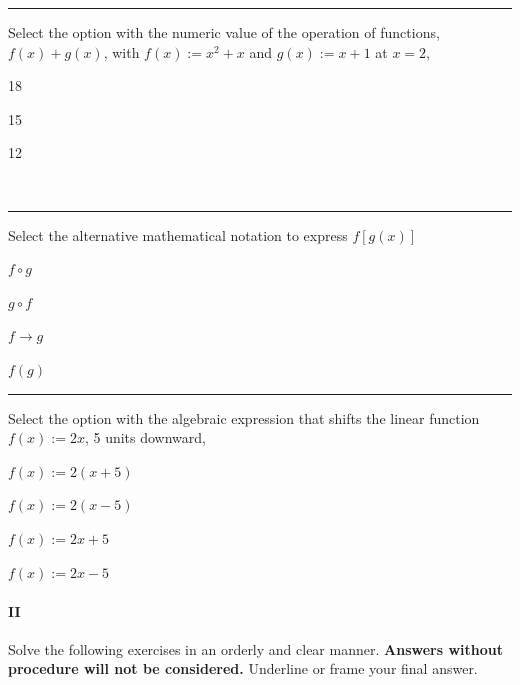 \begin{preguntas}
\pregunta[5] \rule{1cm}{0.1mm} Select the option with the numeric value of the operation of functions, $f(x) + g(x)$, with $f(x):= x^2 + x$ and $g(x):=x+1$ at $x=2$,

\begin{enumerate*}[label=(\alph*)]
    \item 18 $\qquad$
    \item 15 $\qquad$
    \item 12 $\qquad$
    \item {} $\qquad$
\end{enumerate*}

\pregunta[5] \rule{1cm}{0.1mm} Select the alternative mathematical notation to express $f[g(x)]$

\begin{enumerate*}[label=(\alph*)]
    \item $\boxed{f\circ g}\qquad$
    \item $g\circ f\qquad$
    \item $f\to g\qquad$
    \item $f(g)\qquad$
\end{enumerate*}

\pregunta[5] \rule{1cm}{0.1mm} Select the option with the algebraic expression that shifts the linear function $f(x):=2x$, 5 units downward,

\begin{enumerate*}[label=(\alph*)]
    \item $f(x):=2(x+5)\qquad$
    \item $f(x):=2(x-5)\qquad$
    \item $f(x):=2x+5\qquad$
    \item $\boxed{f(x):=2x-5}\qquad$
\end{enumerate*}


\end{preguntas}

\newpage

\paragraph{II} Solve the following exercises in an orderly and clear manner. 
\textbf{Answers without procedure will not be considered.}
Underline or frame your final answer.

